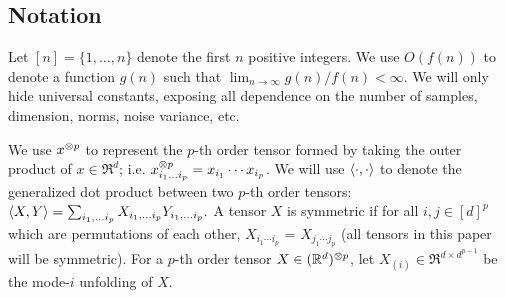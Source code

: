 




\subsection{Notation}


Let $[n] = \{ 1, \dots, n \}$ denote the first $n$ positive integers.
We use $O(f(n))$ to denote a function $g(n)$ such that $\lim_{n \to\infty} g(n)/f(n) < \infty$.
We will only hide universal constants, exposing all dependence on the number of samples,
dimension, norms, noise variance, etc.

We use $x^{\otimes p}$ to represent the $p$-th order tensor
formed by taking the outer product of $x \in \Re^d$; i.e. $x^{\otimes p}_{i_1 \ldots
i_p} = x_{i_1} \cdots x_{i_p}$. We will use
$\langle \cdot, \cdot \rangle$ to denote the generalized dot product between two $p$-th
order tensors: $\langle X, Y \rangle = \sum_{i_1, \ldots i_p} X_{i_1,
\ldots i_p} Y_{i_1, \ldots i_p}.$
A tensor $X$ is symmetric if for all $i,j \in [d]^p$ which are permutations of each other,
$X_{i_1 \cdots i_p}$ = $X_{j_1 \cdots j_p}$ (all tensors in this paper will be symmetric).
For a $p$-th order tensor $X \in (\mathbb{R}^d)^{\otimes p}$, let $X_{(i)} \in \Re^{d \times d^{p-1}}$
be the mode-$i$ unfolding of $X$.

